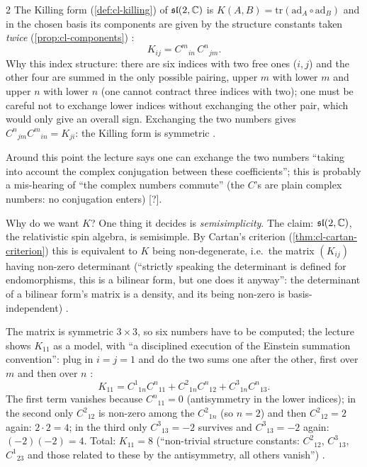 \begin{paracol}{2}
The Killing form (\cref{def:cl-killing}) of $\mathfrak{sl}(2,\mathbb{C})$ is $K(A,B)=\mathrm{tr}(\mathrm{ad}_A\circ\mathrm{ad}_B)$ and in the chosen basis its components are given by the structure constants taken \emph{twice} (\cref{prop:cl-components})   :
\[
  K_{ij}=C^m{}_{in}\,C^n{}_{jm}.
\]
Why this index structure: there are six indices with two free ones ($i,j$) and the other four are summed in the only possible pairing, upper $m$ with lower $m$ and upper $n$ with lower $n$ (one cannot contract three indices with two); one must be careful not to exchange lower indices without exchanging the other pair, which would only give an overall sign. Exchanging the two numbers gives $C^n{}_{jm}C^m{}_{in}=K_{ji}$: the Killing form is symmetric     .
\begin{coursenote}
Around this point the lecture says one can exchange the two numbers ``taking into account the complex conjugation between these coefficients''; this is probably a mis-hearing of ``the complex numbers commute'' (the $C$'s are plain complex numbers: no conjugation enters) [?]. 
\end{coursenote}
Why do we want $K$? One thing it decides is \emph{semisimplicity}. The claim: $\mathfrak{sl}(2,\mathbb{C})$, the relativistic spin algebra, is semisimple. By Cartan's criterion (\cref{thm:cl-cartan-criterion}) this is equivalent to $K$ being non-degenerate, i.e.\ the matrix $(K_{ij})$ having non-zero determinant (``strictly speaking the determinant is defined for endomorphisms, this is a bilinear form, but one does it anyway'': the determinant of a bilinear form's matrix is a density, and its being non-zero is basis-independent)    .

The matrix is symmetric $3\times3$, so six numbers have to be computed; the lecture shows $K_{11}$ as a model, with ``a disciplined execution of the Einstein summation convention'': plug in $i=j=1$ and do the two sums one after the other, first over $m$ and then over $n$    :
\[
  K_{11}=C^1{}_{1n}C^n{}_{11}+C^2{}_{1n}C^n{}_{12}+C^3{}_{1n}C^n{}_{13}.
\]
The first term vanishes because $C^n{}_{11}=0$ (antisymmetry in the lower indices); in the second only $C^2{}_{12}$ is non-zero among the $C^2{}_{1n}$ (so $n=2$) and then $C^2{}_{12}=2$ again: $2\cdot2=4$; in the third only $C^3{}_{13}=-2$ survives and $C^3{}_{13}=-2$ again: $(-2)(-2)=4$. Total: $K_{11}=8$ (``non-trivial structure constants: $C^2{}_{12}$, $C^3{}_{13}$, $C^1{}_{23}$ and those related to these by the antisymmetry, all others vanish'')         .


\end{paracol}
